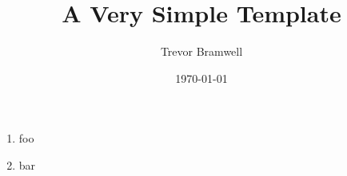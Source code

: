 \documentclass[12pt]{article}
\title{A Very Simple \LaTeXe{} Template}
\author{
    Trevor Bramwell \\
}
\date{\today}
\begin{document}
\maketitle

\section{}
\subsection{}

\begin{enumerate}
    \item foo
    \item bar
\end{enumerate}
\end{document}
